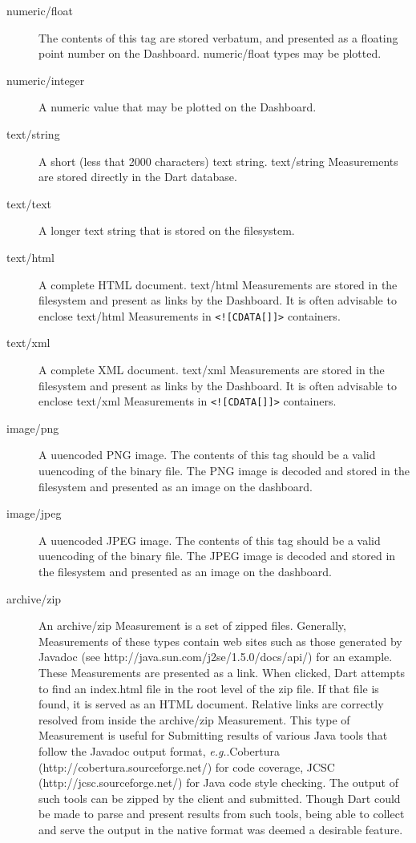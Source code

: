 \documentclass{InsightBook}
\makeatletter
\newcommand{\xmltag}[1]{\texttt{<#1>}}
\DeclareRobustCommand\onedot{\futurelet\@let@token\@onedot}
\def\@onedot{\ifx\@let@token.\else.\xspace\fi}
\def\eg{\emph{e.g}\onedot} \def\Eg{\emph{E.g}\onedot}
\makeatother
\begin{document}
\begin{description}
  \item[numeric/float]{The contents of this tag are stored verbatum,
and presented as a floating point number on the Dashboard.
numeric/float types may be plotted.}
  \item[numeric/integer]{A numeric value that may be plotted on the
Dashboard.}
  \item[text/string]{A short (less that 2000 characters) text string.
text/string Measurements are stored directly in the Dart database.}
  \item[text/text]{A longer text string that is stored on the
filesystem.}
  \item[text/html]{A complete HTML document.  text/html Measurements
are stored in the filesystem and present as links by the Dashboard.
It is often advisable to enclose text/html Measurements in
\xmltag{![CDATA[]]} containers.}
  \item[text/xml]{A complete XML document.  text/xml Measurements
are stored in the filesystem and present as links by the Dashboard. 
It is often advisable to enclose text/xml Measurements in
\xmltag{![CDATA[]]} containers.}
  \item[image/png]{A uuencoded PNG image.  The contents of this tag
should be a valid uuencoding of the binary file.  The PNG image is
decoded and stored in the filesystem and presented as an image on the dashboard.}
  \item[image/jpeg]{A uuencoded JPEG image.  The contents of this tag
should be a valid uuencoding of the binary file.  The JPEG image is
decoded and stored in the filesystem and presented as an image on the
dashboard.}
  \item[archive/zip]{An archive/zip Measurement is a set of zipped
files.  Generally, Measurements of these types contain web sites such
as those generated by Javadoc (see
http://java.sun.com/j2se/1.5.0/docs/api/) for an example.  These
Measurements are presented as a link.  When clicked, Dart attempts to
find an index.html file in the root level of the zip file.  If that
file is found, it is served as an HTML document.  Relative links are
correctly resolved from inside the archive/zip Measurement.  This type
of Measurement is useful for Submitting results of various Java tools
that follow the Javadoc output format, \eg Cobertura
(http://cobertura.sourceforge.net/) for code coverage, JCSC
(http://jcsc.sourceforge.net/) for Java code style checking.  The
output of such tools can be zipped by the client and submitted.
Though Dart could be made to parse and present results from such
tools, being able to collect and serve the output in the native format
was deemed a desirable feature.}
\end{description}
\end{document}
